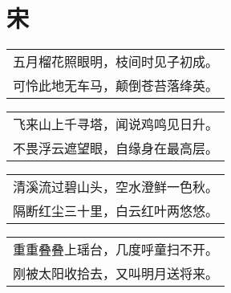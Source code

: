 \chapter{宋}
\nopagebreak%
\nopagebreak%
\noindent\begin{minipage}{\linewidth}
  \vskip-3pt\begin{table}[H]
    \centering
    \begin{tabular}{@{}l@{}}
五月榴花照眼明，枝间时见子初成。\\
可怜此地无车马，颠倒苍苔落绛英。
    \end{tabular}
  \end{table}
\end{minipage}
\vspace{1cm}


\nopagebreak%
\nopagebreak%
\noindent\begin{minipage}{\linewidth}
  \vskip-3pt\begin{table}[H]
    \centering
    \begin{tabular}{@{}l@{}}
飞来山上千寻塔，闻说鸡鸣见日升。\\
不畏浮云遮望眼，自缘身在最高层。
    \end{tabular}
  \end{table}
\end{minipage}
\vspace{1cm}


\nopagebreak%
\nopagebreak%
\noindent\begin{minipage}{\linewidth}
  \vskip-3pt\begin{table}[H]
    \centering
    \begin{tabular}{@{}l@{}}
清溪流过碧山头，空水澄鲜一色秋。\\
隔断红尘三十里，白云红叶两悠悠。
    \end{tabular}
  \end{table}
\end{minipage}
\vspace{1cm}


\nopagebreak%
\nopagebreak%
\noindent\begin{minipage}{\linewidth}
  \vskip-3pt\begin{table}[H]
    \centering
    \begin{tabular}{@{}l@{}}
重重叠叠上瑶台，几度呼童扫不开。\\
刚被太阳收拾去，又叫明月送将来。
    \end{tabular}
  \end{table}
\end{minipage}
\vspace{1cm}


